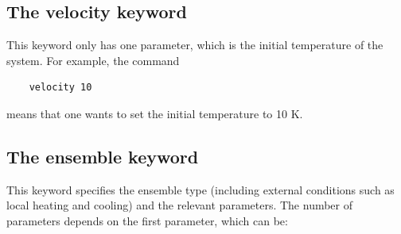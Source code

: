 \documentclass[12pt,a4paper]{report}
\begin{document}
\subsection{The velocity keyword}

This keyword only has one parameter, which is the initial temperature of the system. For example, the command
\begin{verbatim}
    velocity 10
\end{verbatim}
means that one wants to set the initial temperature to 10 K.

\subsection{The ensemble keyword}

This keyword specifies the ensemble type (including external conditions such as local heating and cooling) and the relevant parameters. The number of parameters depends on the first parameter, which can be:
\end{document}
